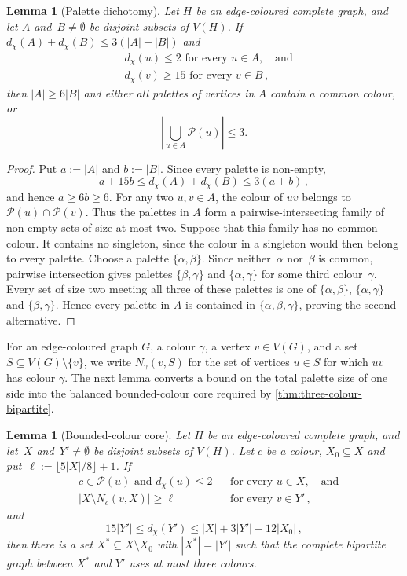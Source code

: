 \documentclass[a4paper,12pt,reqno]{amsart}
\newtheorem{lemma}[theorem]{Lemma}
\newcommand{\cP}{\mathcal P}
\newcommand{\dd}{d_{\chi}}
\begin{document}
\begin{lemma}[Palette dichotomy]\label{lem:palette-dichotomy} Let $H$ be an
edge-coloured complete graph, and let $A$ and~$B\neq\emptyset$ be disjoint
subsets of $V(H)$. If $\dd(A)+\dd(B)\le3(|A|+|B|)$ and
\begin{align*}
&\dd(u) \leq 2\text{ for every }u\in A,\quad\text{and}\\
&\dd(v) \geq 15 \text{ for every }v\in B\,,
\end{align*}
then $|A| \ge 6|B|$ and either all palettes of vertices in $A$ contain a common
colour, or
\[
  \left|\bigcup_{u\in A}\cP(u)\right|\le3.
\]
\end{lemma}

\begin{proof}
Put $a:=|A|$ and $b:=|B|$. Since every palette is non-empty,
  \[
    a+15b\le \dd(A)+\dd(B)\le3(a+b)\,,
  \]
  and hence $a\ge6b\ge6$. For any two $u,v\in A$, the colour of $uv$
  belongs to $\cP(u)\cap\cP(v)$. Thus the palettes in $A$ form a
  pairwise-intersecting family of non-empty sets of size at most two.
  Suppose that this family has no common colour. It contains no singleton, since
  the colour in a singleton would then belong to every palette. Choose a palette
  $\{\alpha,\beta\}$. Since neither~$\alpha$ nor~$\beta$ is common, pairwise
  intersection gives palettes $\{\beta,\gamma\}$ and $\{\alpha,\gamma\}$ for
  some third colour~$\gamma$. Every set of size two meeting all three of these
  palettes is one of $\{\alpha,\beta\}$, $\{\alpha,\gamma\}$ and
  $\{\beta,\gamma\}$. Hence every palette in $A$ is contained in
  $\{\alpha,\beta,\gamma\}$, proving the second alternative.
\end{proof}

For an edge-coloured graph $G$, a colour $\gamma$, a vertex $v\in V(G)$, and a
set $S\subseteq V(G)\setminus\{v\}$, we write $N_\gamma(v,S)$ for the set of
vertices $u\in S$ for which $uv$ has colour $\gamma$. The next lemma
converts a bound on the total palette size of one side into the balanced
bounded-colour core required by \cref{thm:three-colour-bipartite}.

\begin{lemma}[Bounded-colour core]\label{lem:bounded-colour-core} Let $H$ be an
  edge-coloured complete graph, and let~$X$ and~$Y'\neq\emptyset$ be disjoint
subsets of $V(H)$. Let $c$ be a colour, $X_0\subseteq X$ and put~$\ell:=\lfloor 5|X|/8\rfloor+1$. If
\begin{align*}
&c\in\cP(u)\text{ and }\dd(u)\le2
  &&\text{for every }u\in X,\quad\text{and}\\
&|X\setminus N_c(v,X)|\ge\ell
  &&\text{for every }v\in Y'\,,
\end{align*}
and
\[
  15|Y'|\le\dd(Y')\le |X|+3|Y'|-12|X_0|\,,
\]
then there is a set $X^*\subseteq X\setminus X_0$ with $|X^*|=|Y'|$ such that
the complete bipartite graph between $X^*$ and $Y'$ uses at most three
colours.
\end{lemma} 
\end{document}
